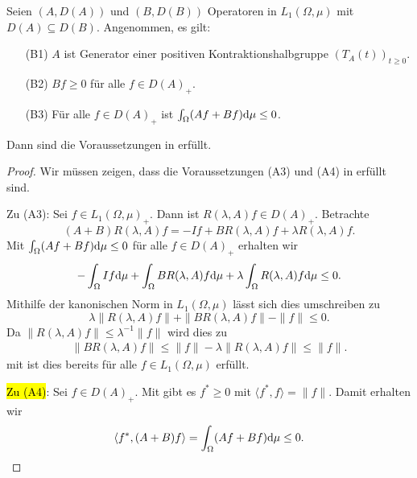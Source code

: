 \begin{fsatz}\label{Hauptaussage in AL}
Seien $(A, D(A))$ und $(B, D(B))$ Operatoren in  $L_1(\Omega, \mu)$ mit $D(A)\subseteq D(B)$. Angenommen, es gilt:
\begin{enumerate}
\item[\textnormal{(B1)}] $A$ ist Generator einer positiven Kontraktionshalbgruppe $(T_A(t))_{t\geq0}$.
\item[\textnormal{(B2)}] $Bf\geq0$ für alle $f\in D(A)_+$.
\item[\textnormal{(B3)}] Für alle $f\in D(A)_+$ ist $\int_\Omega (Af+Bf)\textnormal d\mu\leq 0$.
\end{enumerate}
Dann sind die Voraussetzungen in  erfüllt.
\end{fsatz}

\begin{proof}
\par
Wir müssen zeigen, dass die Voraussetzungen (A3) und (A4) in  erfüllt sind. 


\par
Zu (A3): Sei $f\in L_1(\Omega,\mu)_+$. Dann ist $R(\lambda, A)f\in D(A)_+$. Betrachte
\begin{equation*}
(A+B)R(\lambda, A)f=-If+BR(\lambda, A)f+\lambda R(\lambda, A)f.
\end{equation*}
Mit $\int_\Omega (Af+Bf)\textnormal d\mu\leq 0$ für alle $f\in D(A)_+$ erhalten wir
\begin{equation*}
-\int_\Omega If\textnormal d\mu + \int_\Omega BR(\lambda, A)f\textnormal d\mu + \lambda \int_\Omega R(\lambda, A)f\textnormal d\mu\leq 0.
\end{equation*}
Mithilfe der kanonischen Norm in $L_1(\Omega, \mu)$ lässt sich dies umschreiben zu
\begin{equation*}
\lambda \|R(\lambda, A)f\| + \|BR(\lambda, A)f\| - \|f\|\leq 0.
\end{equation*}
Da $\|R(\lambda, A)f\|\leq \lambda^{-1}\|f\|$ wird dies zu
\begin{align*}
\|BR(\lambda, A)f\|\leq\|f\| - \lambda\|R(\lambda, A)f\|\leq \|f\|.
\end{align*}
mit \Cref{} ist dies bereits für alle $f\in L_1(\Omega,\mu)$ erfüllt.

\par
\hl{Zu (A4)}: Sei $f\in D(A)_+$.  Mit  gibt es $f^*\geq0$ mit $\langle f^*, f\rangle=\|f\|$. Damit erhalten wir 
\begin{equation*}
\langle f^*, (A+B)f\rangle=\int_\Omega (Af+Bf)\textnormal d\mu\leq 0.
\end{equation*}

\end{proof}


